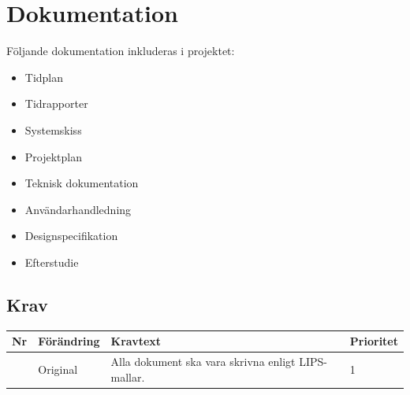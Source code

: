 \documentclass[a4paper,titlepage,12pt]{article}
\newcounter{reqNr}
\newcommand{\nextReqNr}{\stepcounter{reqNr}\arabic{reqNr}}
\begin{document}
	\section{Dokumentation}
    Följande dokumentation inkluderas i projektet:
    \begin{itemize}
		\item Tidplan
        \item Tidrapporter
		\item Systemskiss 
		\item Projektplan
		\item Teknisk dokumentation 
		\item Användarhandledning 
        \item Designspecifikation
        \item Efterstudie
    \end{itemize}

	\subsection{Krav}
	\begin{longtable}[c]{ c l>{\raggedright}p{} l }
		\textbf{Nr} & \textbf{Förändring} & \textbf{Kravtext} & \textbf{Prioritet} 
			\\ \midrule

		\nextReqNr{} & Original & Alla dokument ska vara skrivna
		enligt LIPS-mallar. & 1
			\\ 

	\end{longtable}
\end{document}
